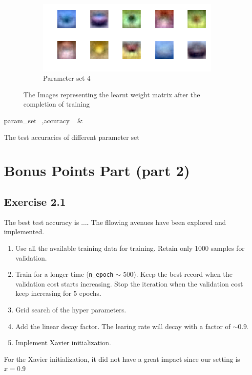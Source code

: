\documentclass[12pt]{article}
\begin{document}
\begin{figure}
\begin{subfigure}[b]{0.475\textwidth}
        \centering
        \includegraphics[width=\textwidth]{wgt_case4.png}
        \caption[]%
        {{\small Parameter set 4}}
    \end{subfigure}
    \caption[]
    {\small The Images representing the learnt weight matrix after the completion of training}
    \label{fig:wgt_mat}
\end{figure}

\begin{table}
    \centering
    {param_set=\paramset,accuracy=\accuracy}
    {\paramset & \accuracy}
    \caption{The test accuracies of different parameter set}
    \label{table:accuracy}
\end{table}

\section{Bonus Points Part (part 2)}

\subsection{Exercise 2.1}

The best test accuracy is ....
The fllowing avenues have been explored and implemented.
\begin{enumerate}
    \item Use all the available training data for training. Retain only 1000 samples
        for validation.
    \item Train for a longer time (\texttt{n\_epoch} $\sim$ 500). Keep the best record
        when the validation cost starts increasing. Stop the iteration when the validation
        cost keep increasing for 5 epochs.
    \item Grid search of the hyper parameters.
    \item Add the linear decay factor. The learing rate will decay with a factor of $\sim 0.9$.
    \item Implement Xavier initialization.
\end{enumerate}

For the Xavier initialization, it did not have a great impact since our setting
is $x = 0.9$
\end{document}
